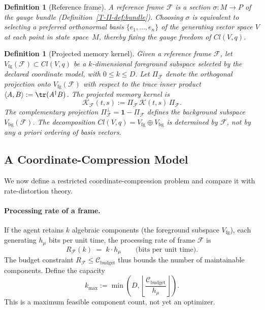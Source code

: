 \documentclass[12pt,a4paper,openany]{book}
\newtheorem{definition}[theorem]{Definition}
\begin{document}
\begin{definition}[Reference frame]
\label{T-II-def:frame}
A \emph{reference frame} $\mathcal{F}$ is a section
$\sigma: M \to P$ of the gauge bundle
(Definition~\ref{T-II-def:bundle}).
Choosing $\sigma$ is equivalent to selecting a preferred
orthonormal basis $\{e_1, \ldots, e_n\}$ of the generating
vector space $V$ at each point in state space~$M$, thereby
fixing the gauge freedom of $Cl(V,q)$.
\end{definition}

\begin{definition}[Projected memory kernel]
\label{T-II-def:projected}
Given a reference frame $\mathcal{F}$, let
$V_{\mathrm{fg}}(\mathcal{F}) \subset Cl(V,q)$ be a
$k$-dimensional \emph{foreground subspace} selected by the declared
coordinate model, with $0\leq k\leq D$.
Let $\Pi_{\mathcal{F}}$ denote the orthogonal projection
onto $V_{\mathrm{fg}}(\mathcal{F})$ with respect to the
trace inner product
$\langle A, B \rangle := \tr(A^\dagger B)$.
The \emph{projected memory kernel} is
\begin{equation}
\label{T-II-eq:projected_kernel}
\mathcal{K}_{\mathcal{F}}(t,s)
:= \Pi_{\mathcal{F}}\,\mathcal{K}(t,s)\,
   \Pi_{\mathcal{F}}.
\end{equation}
The complementary projection
$\Pi_{\mathcal{F}}^{\perp}
= \mathbf{1} - \Pi_{\mathcal{F}}$ defines the
\emph{background subspace} $V_{\mathrm{bg}}(\mathcal{F})$.
The decomposition
$Cl(V,q) = V_{\mathrm{fg}} \oplus V_{\mathrm{bg}}$
is determined by $\mathcal{F}$, not by any \emph{a priori}
ordering of basis vectors.
\end{definition}

\subsection{A Coordinate-Compression Model}
\label{T-II-subsec:RD_bound}

We now define a restricted coordinate-compression problem and compare it
with rate-distortion theory.

\paragraph{Processing rate of a frame.}
If the agent retains $k$ algebraic components (the foreground
subspace $V_{\mathrm{fg}}$), each generating $h_\mu$ bits
per unit time, the processing rate of frame $\mathcal{F}$ is
\begin{equation}
\label{T-II-eq:R_frame}
R_{\mathcal{F}}(k) \;=\; k \cdot h_\mu
\qquad\text{(bits per unit time)}.
\end{equation}
The budget constraint $R_{\mathcal{F}} \leq
\mathcal{C}_{\mathrm{budget}}$ thus bounds the number of
maintainable components.
Define the capacity
\begin{equation}
k_{\max}:=\min\!\left(D,
\left\lfloor\frac{\mathcal C_{\mathrm{budget}}}{h_\mu}\right\rfloor
\right).
\end{equation}
This is a maximum feasible component count, not yet an optimizer.
\end{document}
